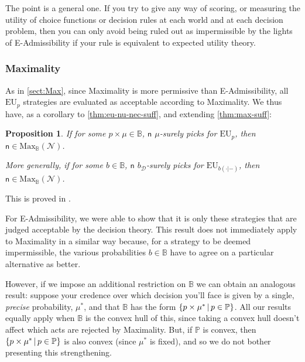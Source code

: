 \documentclass[a4paper,final]{article}
\newtheorem{proposition}[theorem]{Proposition}
\renewcommand\P{\mathbb{P}} %
\newcommand\EU{\mathrm{EU}}
\newcommand\Maximality{\mathrm{Max}}
\newcommand{\Decs}{\mathcal{D}}
\newcommand{\n}{\mathsf{n}}
\newcommand\Nu{\mathcal{N}}
\newcommand{\IB}{\mathbb{B}}
\newcommand{\IP}{\P}
\newcommand{\todoold}[2][]{\todo[backgroundcolor=white,bordercolor=orange!10,linecolor=gray!10, #1,caption={},textcolor=gray]{Pre-rev: #2}}
\newcommand{\todooldinfo}[2][]{\todoold[#1]{#2}}
\newcommand\SetDelimiter[1][]{
	\nonscript\,#1\vert \allowbreak \nonscript\,\mathopen{}}
\providecommand\given{\SetDelimiter}
\newenvironment{CCM rewritten}
{\begingroup\color{blue}} %
{\endgroup}              %
\begin{document}
	The point is a general one.  If you try to give any way of scoring, or measuring the utility of choice functions or decision rules at each world and at each decision problem, then you can only avoid being ruled out as impermissible by the lights of E-Admissibility if your rule is equivalent to expected utility theory. 


\subsubsection{Maximality}\label{sect:nu:Max}


As in \cref{sect:Max}, since Maximality is more permissive than E-Admissibility, all $\EU_p$ strategies are evaluated as acceptable according to Maximality. We thus have, as a corollary to \cref{thm:eu-nu-nec-suff}, and extending \cref{thm:max-suff}:
\begin{proposition}\label{thm:max-nu-suff}
		If for some $p\times\mu\in \IB$, $\n$ $\mu$-surely picks for $\EU_{p}$, then $\n\in\Maximality_\IB(\Nu)$. 
		
		More generally, if for some $b\in \IB$, $\n$ $b_\Decs$-surely picks for $\EU_{b(\cdot|-)}$, then $\n\in\Maximality_\IB(\Nu)$. 
\end{proposition}
This is proved in .

For E-Admissibility, we were able to show that it is only these strategies that are judged acceptable by the decision theory. This result does not immediately apply to Maximality in a similar way because, for a strategy to be deemed impermissible, the various probabilities $b\in \IB$ have to agree on a particular alternative as better.

However, if we impose an additional restriction on $\IB$ we can obtain an analogous result: suppose your credence over which decision you'll face is given by a single, \emph{precise} probability, $\mu^*$, and that $\IB$ has the form $\{p\times \mu^*\given p\in \IP\}$. All our results equally apply when $\IB$ is the convex hull of this, since taking a convex hull doesn't affect which acts are rejected by Maximality. But, if $\IP$ is convex, then $\{p\times\mu^*\given p\in\IP\}$ is also convex (since $\mu^*$ is fixed), and so we do not bother presenting this strengthening. 
\todoold{check!!!}
\end{document}
